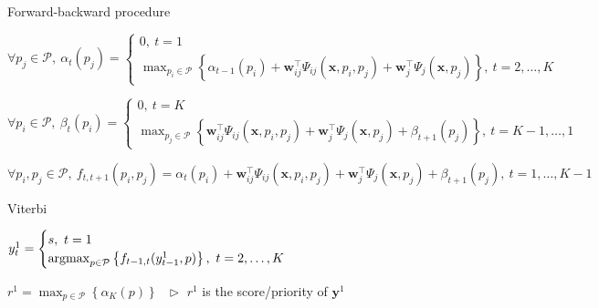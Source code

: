 \begin{algorithm}[htbp]
\caption{Forward-backward procedure~\cite{rabiner1989tutorial}}
\label{alg:forward-backward}
\begin{algorithmic}[1]
  \STATE $\forall p_j \in \mathcal{P},~ \alpha_t(p_j) =
          \begin{cases}
          0,~ t = 1 \\
          \max_{p_i \in \mathcal{P}} \left\{ \alpha_{t-1}(p_i) + \mathbf{w}_{ij}^\top \Psi_{ij}(\mathbf{x}, p_i, p_j) +
          \mathbf{w}_j^\top \Psi_j(\mathbf{x}, p_j) \right\},~ t=2,\dots,K
          \end{cases}$

  \STATE $\forall p_i \in \mathcal{P},~ \beta_t(p_i) =
          \begin{cases}
          0,~ t = K \\
          \max_{p_j \in \mathcal{P}} \left\{ \mathbf{w}_{ij}^\top \Psi_{ij}(\mathbf{x}, p_i, p_j) +
          \mathbf{w}_j^\top \Psi_j(\mathbf{x}, p_j) + \beta_{t+1}(p_j) \right\},~ t = K-1,\dots,1
          \end{cases}$

  \STATE $\forall p_i, p_j \in \mathcal{P},~ f_{t,t+1}(p_i, p_j) = \alpha_t(p_i) + \mathbf{w}_{ij}^\top \Psi_{ij}(\mathbf{x}, p_i, p_j) +
                                \mathbf{w}_j^\top \Psi_j(\mathbf{x}, p_j) + \beta_{t+1}(p_j),~ t = 1,\dots,K-1$
\end{algorithmic}
\end{algorithm}

\begin{algorithm}[htbp]
\caption{Viterbi}
\label{alg:viterbi}
\begin{algorithmic}[1]
  \STATE $y_t^1 = \begin{cases}
                  s,~ t = 1 \\
                  \operatorname*{argmax}_{p \in \mathcal{P}} \left\{ f_{t-1,t}(y_{t-1}^1, p) \right\},~ t = 2,\dots,K
                  \end{cases}$

  \STATE $r^1 = \max_{p \in \mathcal{P}} \left\{ \alpha_{K}(p) \right\}~~~ \triangleright$ $r^1$ is the score/priority of $\mathbf{y}^1$
\end{algorithmic}
\end{algorithm}


